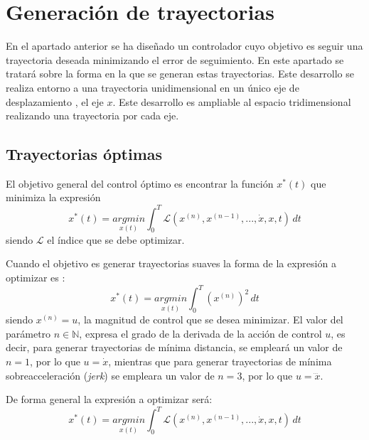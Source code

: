 \chapter{Generación de trayectorias}\label{cap:gen_tray}

En el apartado anterior se ha diseñado un controlador cuyo objetivo es seguir una trayectoria deseada minimizando el error de seguimiento. En este apartado se tratará sobre la forma en la que se generan estas trayectorias. Este desarrollo se realiza entorno a una trayectoria unidimensional en un único eje de desplazamiento , el eje $x$. Este desarrollo es ampliable al espacio tridimensional realizando una trayectoria por cada eje.


\section{Trayectorias óptimas}\label{trajectoriasoptimas:cap}
El objetivo general del control óptimo es encontrar la función $x^*(t)$ que minimiza la expresión
\begin{equation}
	x^*(t) =  \underset{x(t)}{argmin}\int_{0}^{T}\mathcal{L}\left(x^{(n)},x^{(n-1)},...,\dot{x},x,t\right)\, dt
\end{equation}
siendo $\mathcal{L}$ el índice que se debe optimizar.

Cuando el objetivo es generar trayectorias suaves la forma de la expresión a optimizar es :
\begin{equation}
	x^*(t) = \underset{x(t)}{argmin}\int_{0}^{T}\left(x^{(n)}\right)^2\, dt
\end{equation}
siendo $x^{(n)} = u $, la magnitud de control que se desea minimizar. El valor del parámetro $n\in\mathbb{N}$, expresa el grado de la derivada de la acción de control $u$, es decir, para generar trayectorias de mínima distancia, se empleará un valor de $n=1$, por lo que $u = \dot{x}$, mientras que para generar trayectorias de mínima sobreacceleración (\textit{jerk}) se empleara un valor de $n=3$, por lo que $u = \dddot{x}$.

De forma general la expresión a optimizar será:
	\begin{equation}
		x^*(t) = \underset{x(t)}{argmin}\int_{0}^{T}\mathcal{L}\left(x^{(n)}, x^{(n-1)},...,\dot{x},x,t\right)\, dt
	\end{equation}

